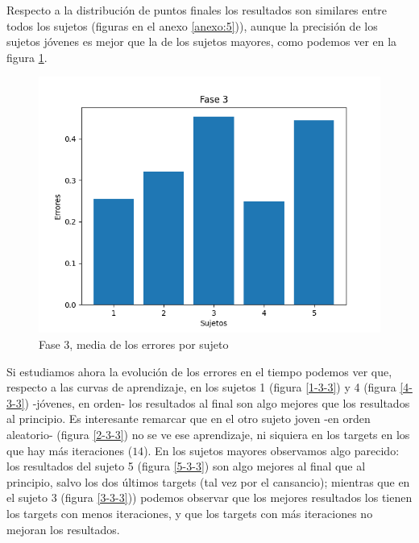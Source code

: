 \documentclass[a4paper,11pt, oneside]{book}
\begin{document}
Respecto a la distribución de puntos finales los resultados son similares entre todos los sujetos (figuras en el anexo \ref{anexo:5})), aunque la precisión de los sujetos jóvenes es mejor que la de los sujetos mayores, como podemos ver en la figura \ref{fase3-errores}.

\begin{figure}[H]
	\includegraphics[width=\linewidth]{fase3-errores}
	\caption{Fase 3, media de los errores por sujeto}
	\label{fase3-errores}
\end{figure}




Si estudiamos ahora la evolución de los errores en el tiempo podemos ver que, respecto a las curvas de aprendizaje, en los sujetos 1 (figura \ref{1-3-3}) y 4 (figura \ref{4-3-3}) -jóvenes, en orden- los resultados al final son algo mejores que los resultados al principio. Es interesante remarcar que en el otro sujeto joven -en orden aleatorio- (figura \ref{2-3-3}) no se ve ese aprendizaje, ni siquiera en los targets en los que hay más iteraciones ($14$). En los sujetos mayores observamos algo parecido: los resultados del sujeto 5 (figura \ref{5-3-3}) son algo mejores al final que al principio, salvo los dos últimos targets (tal vez por el cansancio); mientras que en el sujeto 3 (figura \ref{3-3-3})) podemos observar que los mejores resultados los tienen los targets con menos iteraciones, y que los targets con más iteraciones no mejoran los resultados.
\end{document}

